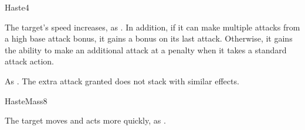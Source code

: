 \begin{spellsection}{Haste}{4}
\begin{spellheader}
\end{spellheader}
\begin{spellcontent}
    \begin{spelltargetinginfo}
    \end{spelltargetinginfo}
    \begin{spelleffects}
        \spelleffect The target's speed increases, as . In addition, if it can make multiple attacks from a high base attack bonus, it gains a  bonus on its last attack. Otherwise, it gains the ability to make an additional attack at a  penalty when it takes a standard attack action.
        \spelldur \durshort
    \end{spelleffects}
\end{spellcontent}
\begin{spellfooter}
    \spellnotes As . The extra attack granted does not stack with similar effects.
\end{spellfooter}
\end{spellsection}

\begin{spellsection}{Haste}{Mass}{8}
\begin{spellheader}
\end{spellheader}
\begin{spellcontent}
    \begin{spelltargetinginfo}
    \end{spelltargetinginfo}
    \begin{spelleffects}
        \spelleffect The target moves and acts more quickly, as .
    \end{spelleffects}
\end{spellcontent}
\begin{spellfooter}
\end{spellfooter}
\end{spellsection}

